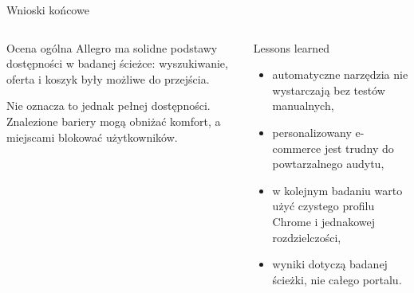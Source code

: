 \documentclass[aspectratio=169,11pt]{beamer}
\begin{document}
\begin{frame}{Wnioski końcowe}
  \begin{columns}[T,totalwidth=\textwidth]
      \begin{exampleblock}{Ocena ogólna}
        Allegro ma solidne podstawy dostępności w badanej ścieżce: wyszukiwanie, oferta i koszyk były możliwe do przejścia.

        \vspace{0.25cm}
        Nie oznacza to jednak pełnej dostępności. Znalezione bariery mogą obniżać komfort, a miejscami blokować użytkowników.
      \end{exampleblock}

      \begin{block}{Lessons learned}
        \begin{itemize}
          \item automatyczne narzędzia nie wystarczają bez testów manualnych,
          \item personalizowany e-commerce jest trudny do powtarzalnego audytu,
          \item w kolejnym badaniu warto użyć czystego profilu Chrome i jednakowej rozdzielczości,
          \item wyniki dotyczą badanej ścieżki, nie całego portalu.
        \end{itemize}
      \end{block}
  \end{columns}
\end{frame}
\end{document}
